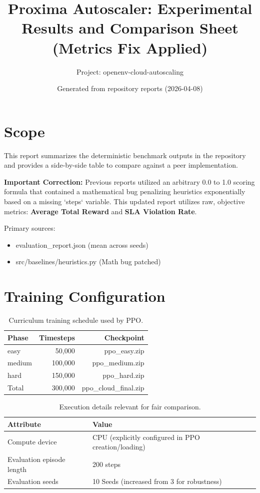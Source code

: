 \documentclass[11pt,a4paper]{article}
\title{Proxima Autoscaler: Experimental Results and Comparison Sheet (Metrics Fix Applied)}
\author{Project: openenv-cloud-autoscaling}
\date{Generated from repository reports (2026-04-08)}
\begin{document}
\maketitle

\section{Scope}
This report summarizes the deterministic benchmark outputs in the repository and provides a side-by-side table to compare against a peer implementation. 

\textbf{Important Correction:} Previous reports utilized an arbitrary 0.0 to 1.0 scoring formula that contained a mathematical bug penalizing heuristics exponentially based on a missing `steps` variable. This updated report utilizes raw, objective metrics: \textbf{Average Total Reward} and \textbf{SLA Violation Rate}.

Primary sources:
\begin{itemize}
  \item evaluation\_report.json (mean across seeds)
  \item src/baselines/heuristics.py (Math bug patched)
\end{itemize}

\section{Training Configuration}
\begin{table}[h!]
\centering
\begin{tabular}{lrr}
\toprule
Phase & Timesteps & Checkpoint \\
\midrule
easy   &  50,000 & ppo\_easy.zip \\
medium & 100,000 & ppo\_medium.zip \\
hard   & 150,000 & ppo\_hard.zip \\
\midrule
Total  & 300,000 & ppo\_cloud\_final.zip \\
\bottomrule
\end{tabular}
\caption{Curriculum training schedule used by PPO.}
\end{table}

\begin{table}[h!]
\centering
\begin{tabular}{ll}
\toprule
Attribute & Value \\
\midrule
Compute device & CPU (explicitly configured in PPO creation/loading) \\
Evaluation episode length & 200 steps \\
Evaluation seeds & 10 Seeds (increased from 3 for robustness) \\
\bottomrule
\end{tabular}
\caption{Execution details relevant for fair comparison.}
\end{table}
\end{document}
